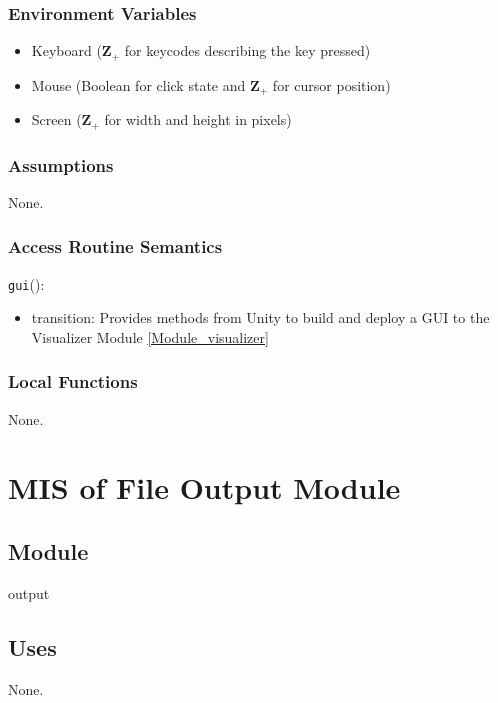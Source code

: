 \documentclass[12pt, titlepage]{article}
\begin{document}
\subsubsection{Environment Variables}

\begin{itemize}
  \item Keyboard ($\mathbf{Z}_{+}$ for keycodes describing the key pressed)
  \item Mouse (Boolean for click state and  $\mathbf{Z}_{+}$ for cursor position)
  \item Screen ($\mathbf{Z}_{+}$ for width and height in pixels)
\end{itemize}

\subsubsection{Assumptions}

None.

\subsubsection{Access Routine Semantics}

\noindent \texttt{gui}():
\begin{itemize}
\item transition: Provides methods from Unity to build and deploy a GUI to the Visualizer Module \ref{Module_visualizer}
\end{itemize}

\subsubsection{Local Functions}

None.

\newpage

\section{MIS of File Output Module} \label{Module_file_output}

\subsection{Module}

output

\subsection{Uses}
None.
\end{document}
